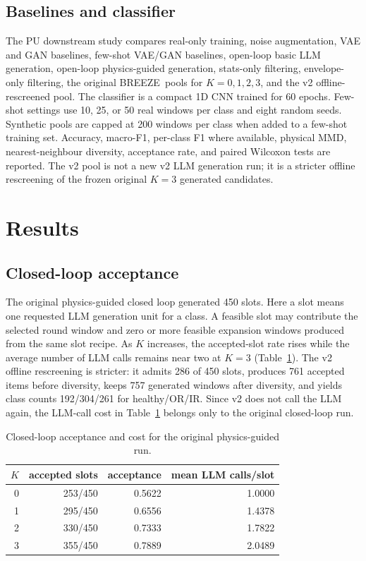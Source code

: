 \documentclass[review,3p,times]{elsarticle}
\newcommand{\breeze}{BREEZE}
\begin{document}
\subsection{Baselines and classifier}

The PU downstream study compares real-only training, noise augmentation, VAE
and GAN baselines, few-shot VAE/GAN baselines, open-loop basic LLM generation,
open-loop physics-guided generation, stats-only filtering, envelope-only
filtering, the original \breeze\ pools for $K=0,1,2,3$, and the v2
offline-rescreened pool. The classifier is a compact 1D CNN trained for 60 epochs. Few-shot
settings use 10, 25, or 50 real windows per class and eight random seeds.
Synthetic pools are capped at 200 windows per class when added to a few-shot
training set. Accuracy, macro-F1, per-class F1 where available, physical MMD,
nearest-neighbour diversity, acceptance rate, and paired Wilcoxon tests are
reported. The v2 pool is not a new v2 LLM generation run; it is a stricter
offline rescreening of the frozen original $K{=}3$ generated candidates.

\section{Results}
\label{sec:results}

\subsection{Closed-loop acceptance}

The original physics-guided closed loop generated 450 slots. Here a slot means
one requested LLM generation unit for a class. A feasible slot may contribute
the selected round window and zero or more feasible expansion windows produced
from the same slot recipe. As $K$ increases,
the accepted-slot rate rises while the average number of LLM calls remains
near two at $K=3$ (Table~\ref{tab:acceptance}). The v2 offline rescreening is
stricter: it admits 286 of 450 slots, produces 761 accepted items before
diversity, keeps 757 generated windows after diversity, and yields class
counts 192/304/261 for healthy/OR/IR. Since v2 does not call the LLM again,
the LLM-call cost in Table~\ref{tab:acceptance} belongs only to the original
closed-loop run.

\begin{table}[H]
\centering
\caption{Closed-loop acceptance and cost for the original physics-guided run.}
\label{tab:acceptance}
\begin{tabular}{rrrr}
\toprule
$K$ & accepted slots & acceptance & mean LLM calls/slot \\
\midrule
0 & 253/450 & 0.5622 & 1.0000 \\
1 & 295/450 & 0.6556 & 1.4378 \\
2 & 330/450 & 0.7333 & 1.7822 \\
3 & 355/450 & 0.7889 & 2.0489 \\
\bottomrule
\end{tabular}
\end{table}
\end{document}
